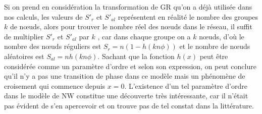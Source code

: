 Si on prend en considération la transformation de GR  qu'on a déjà utilisée dans nos calculs, les valeurs de $S'_{r}$ et $S'_{al}$ représentent en réalité le nombre des groupes $k$ de nœuds,
alors pour trouver le nombre réel des nœuds dans le réseau, il suffit de multiplier $S'_{r}$ et $S'_{al}$  par $k$
, car dans chaque groupe on a $k$ nœuds, d'où le nombre des nœuds réguliers est $S_r=n(1-h(kn\phi))$ et le nombre de nœuds 
aléatoires est $S_{al}=n h(kn\phi)$.
Sachant que la fonction $h(x)$ peut être considérée comme un paramètre d'ordre et selon son expression, on peut conclure qu'il n'y a pas une transition de phase dans ce modèle mais un phénomène de croisement qui commence depuis $x=0$. L'existence d'un tel paramètre d'ordre dans le modèle de NW constitue une découverte très intéressante, car il n'était pas évident de s'en apercevoir et on trouve pas de tel constat dans la littérature.  

